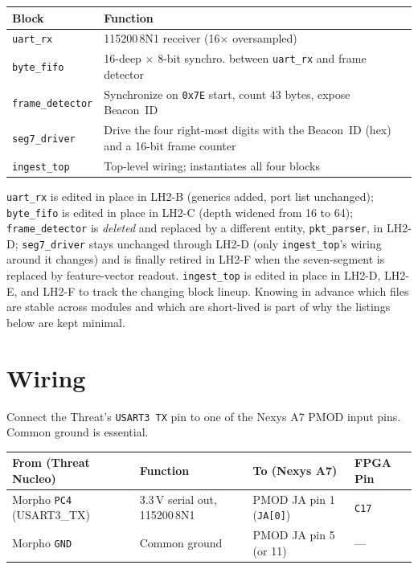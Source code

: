 \documentclass[11pt,letterpaper]{article}
\begin{document}
\begin{table}[h!]
	\centering
	\small
	\begin{tabular}{l l}
		\toprule
		\textbf{Block} & \textbf{Function} \\
		\midrule
		\texttt{uart\_rx} & 115200\,8N1 \UART{} receiver (16$\times$ oversampled) \\
		\texttt{byte\_fifo} & 16-deep $\times$ 8-bit synchro. \FIFO{} between \texttt{uart\_rx} and frame detector \\
		\texttt{frame\_detector} & Synchronize on \texttt{0x7E} start, count 43 bytes, expose Beacon~\mbox{ID} \\
		\texttt{seg7\_driver} & Drive the four right-most digits with the Beacon~\mbox{ID} (hex) and a 16-bit frame counter \\
		\texttt{ingest\_top} & Top-level wiring; instantiates all four blocks \\
		\bottomrule
	\end{tabular}
\end{table}

\begin{tcolorbox}[infobox={What Module~2 replaces}]
\texttt{uart\_rx} is edited in place in LH2-B (generics added, port list unchanged); \texttt{byte\_fifo} is edited in place in LH2-C (depth widened from 16 to 64); \texttt{frame\_detector} is \emph{deleted} and replaced by a different entity, \texttt{pkt\_parser}, in LH2-D; \texttt{seg7\_driver} stays unchanged through LH2-D (only \texttt{ingest\_top}'s wiring around it changes) and is finally retired in LH2-F when the seven-segment is replaced by feature-vector readout. \texttt{ingest\_top} is edited in place in LH2-D, LH2-E, and LH2-F to track the changing block lineup. Knowing in advance which files are stable across modules and which are short-lived is part of why the listings below are kept minimal.
\end{tcolorbox}

\newpage
\section{Wiring}
Connect the Threat's \texttt{USART3 TX} pin to one of the Nexys A7 \mbox{PMOD} input pins. Common ground is essential.

\begin{table}[h!]
	\centering
	\begin{tabular}{l l l l}
		\toprule
		\textbf{From (Threat Nucleo)} & \textbf{Function} & \textbf{To (Nexys A7)} & \textbf{FPGA Pin} \\
		\midrule
		Morpho \texttt{PC4} (USART3\_TX) & 3.3\,V serial out, 115200\,8N1 & PMOD JA pin 1 (\texttt{JA[0]}) & \texttt{C17} \\
		Morpho \texttt{GND}              & Common ground                  & PMOD JA pin 5 (or 11)         & --- \\
		\bottomrule
	\end{tabular}
\end{table}
\end{document}
